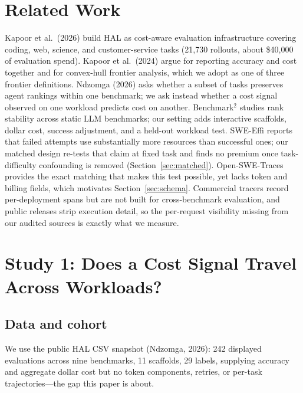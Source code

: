 \documentclass{article}
\begin{document}
\section{Related Work}
\label{sec:related}

Kapoor et al.\ (2026) build HAL as cost-aware evaluation infrastructure covering coding, web, science, and customer-service tasks (21,730 rollouts, about \$40,000 of evaluation spend). Kapoor et al.\ (2024) argue for reporting accuracy and cost together and for convex-hull frontier analysis, which we adopt as one of three frontier definitions. Ndzomga (2026) asks whether a subset of tasks preserves agent rankings within one benchmark; we ask instead whether a cost signal observed on one workload predicts cost on another. Benchmark$^2$ studies rank stability across static LLM benchmarks; our setting adds interactive scaffolds, dollar cost, success adjustment, and a held-out workload test. SWE-Effi reports that failed attempts use substantially more resources than successful ones; our matched design re-tests that claim at fixed task and finds no premium once task-difficulty confounding is removed (Section~\ref{sec:matched}). Open-SWE-Traces provides the exact matching that makes this test possible, yet lacks token and billing fields, which motivates Section~\ref{sec:schema}. Commercial tracers record per-deployment spans but are not built for cross-benchmark evaluation, and public releases strip execution detail, so the per-request visibility missing from our audited sources is exactly what we measure.

\section{Study 1: Does a Cost Signal Travel Across Workloads?}
\label{sec:cost}

\subsection{Data and cohort}
We use the public HAL CSV snapshot (Ndzomga, 2026): 242 displayed evaluations across nine benchmarks, 11 scaffolds, 29 labels, supplying accuracy and aggregate dollar cost but no token components, retries, or per-task trajectories---the gap this paper is about.
\end{document}
